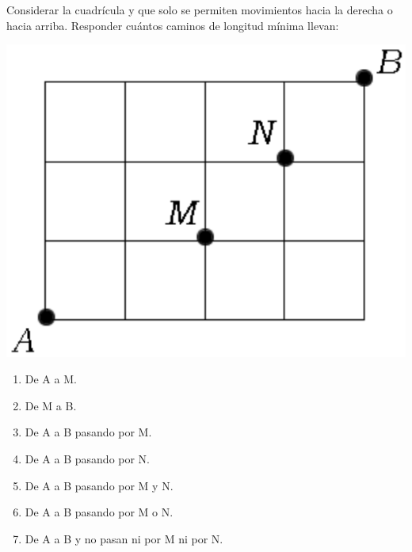 \begin{problema}
    Considerar la cuadrícula y que solo se permiten movimientos hacia la derecha o hacia arriba. Responder cuántos caminos de longitud mínima llevan:

    \begin{center}
        \includegraphics[scale=0.4]{Imagenes/IMG3/Caminos4.png}
    \end{center}

    \renewcommand{\theenumi}{\alph{enumi})}
    \begin{enumerate}      

    
        \item De A a M.
        \item De M a B.
        \item De A a B pasando por M.
        \item De A a B pasando por N.
        \item De A a B pasando por M y N.
        \item De A a B pasando por M o N.
        \item De A a B y no pasan ni por M ni por N.
    \end{enumerate}

\renewcommand{\theenumi}{\arabic{enumi}}

    
\end{problema}


